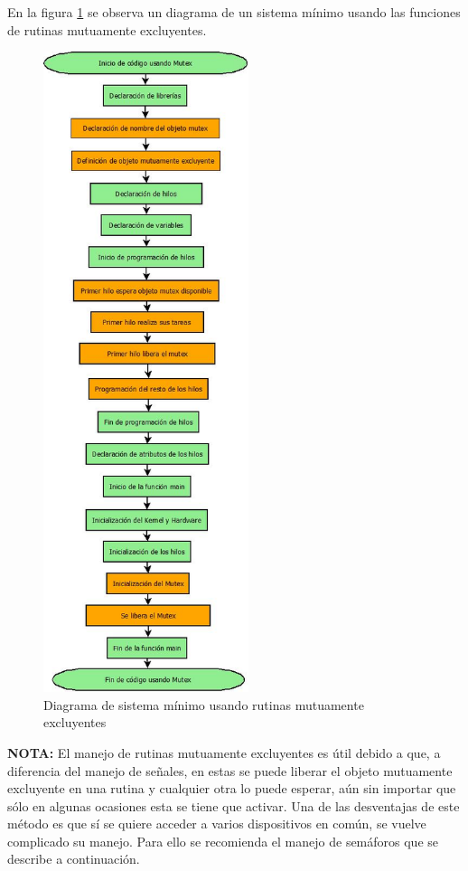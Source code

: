 \documentclass[12pt, twoside]{report}
\begin{document}
En la figura \ref{cap2:006} se observa un diagrama de un sistema mínimo usando las funciones de rutinas mutuamente excluyentes.

\begin{figure}[H]
	\centering
	\includegraphics[width=60mm]{diamutex}
	\caption{Diagrama de sistema mínimo usando rutinas mutuamente excluyentes}
	\label{cap2:006}
\end{figure}

\textbf{NOTA:}
El manejo de rutinas mutuamente excluyentes es útil debido a que, a diferencia del manejo de señales, en estas se puede liberar el objeto mutuamente excluyente en una rutina y cualquier otra lo puede esperar, aún sin importar que sólo en algunas ocasiones esta se tiene que activar. Una de las desventajas de este método es que sí se quiere acceder a varios dispositivos en común, se vuelve complicado su manejo. Para ello se recomienda el manejo de semáforos que se describe a continuación. 
\end{document}
